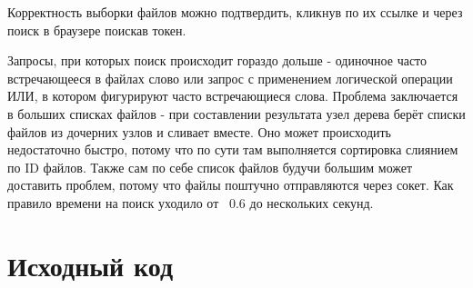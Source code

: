 Корректность выборки файлов можно подтвердить, кликнув по их ссылке и через поиск в браузере поискав токен.

Запросы, при которых поиск происходит гораздо дольше - одиночное часто встречающееся в файлах слово или запрос с применением логической операции ИЛИ, в котором фигурируют часто встречающиеся слова. Проблема заключается в больших списках файлов - при составлении результата узел дерева берёт списки файлов из дочерних узлов и сливает вместе. Оно может происходить недостаточно быстро, потому что по сути там выполняется сортировка слиянием по ID файлов. Также сам по себе список файлов будучи большим может доставить проблем, потому что файлы поштучно отправляются через сокет. Как правило времени на поиск уходило от ~0.6 до нескольких секунд.

\pagebreak

\section{Исходный код}

